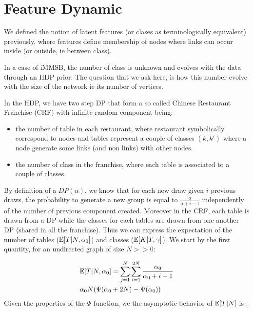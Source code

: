 \section{Feature Dynamic}

We defined the notion of latent features (or clases as terminologically equivalent) previously, where features define membership of nodes where links can occur inside (or outside, ie between class). 


In a case of iMMSB, the number of class is unknown and evolves with the data through an HDP prior. The question that we ask here, is how this number evolve with the size of the network ie its number of vertices.

In the HDP, we have two step DP that form a so called Chinese
Restaurant Franchise (CRF) with infinite random component being:
\begin{itemize}
\item the number of
table in each restaurant, where restaurant symbolically correspond to
nodes and tables represent a couple of classes $(k,k')$ where a node generate some links (and non links) with other nodes. 
\item the
number of class in the franchise, where each table is associated to a couple of classes.
\end{itemize}

By definition of a \(DP(\alpha)\), we know that for each new draw given
\(i\) previous draws, the probability to generate a new group is equal
to \(\frac{\alpha}{\alpha +i-1}\) independently of the number of previous
component created. Moreover in the CRF, each table is drawn from a DP while the classes for each tables are drawn from one another DP (shared in all the franchise). Thus we can express the expectation of the number of tables ($\mathbb{E}[T|N, \alpha_0]$) and classes ($\mathbb{E}[K|T, \gamma]$). We start by the first quantity, for an undirected graph of size $N >> 0$:

\begin{align}
&\mathbb{E}[T|N, \alpha_0] = \sum_{j=1}^N\sum_{i=1}^{2N} \frac{\alpha_0}{\alpha_0 +i-1} \\
& \alpha_0 N (\Psi(\alpha_0+2N) - \Psi(\alpha_0))
\end{align}
Given the properties of the $\Psi$ function, we the asymptotic behavior of $\mathbb{E}[T|N]$ is :


